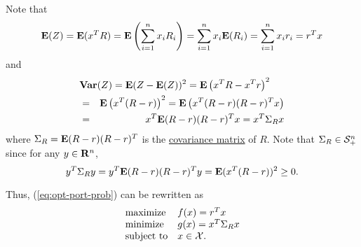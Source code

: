 Note that
\begin{equation}
{\bf E{}}(Z)
= {\bf E{}}(x^T R)
= {\bf E{}} \left(\sum_{i=1}^n x_i R_i \right)
= \sum_{i=1}^n x_i {\bf E{}}(R_i)
= \sum_{i=1}^n x_i r_i
= r^T x
\end{equation}
and
\begin{eqnarray*}
\lefteqn{
\Var(Z) = \Expect(Z-\Expect(Z))^2 = \Expect \left(x^TR-x^Tr \right)^2
}
\\
&=&
\Expect \left(x^T(R-r) \right)^2
= \Expect \left(x^T(R-r)(R-r)^T x \right)
\\
&=&
x^T \Expect(R-r)(R-r)^T x
=
x^T \covmat{R} x
\end{eqnarray*}
where ${\Sigma}_{R} = {\bf E{}}(R-r)(R-r)^T$ is the \href{https://en.wikipedia.org/wiki/Covariance_matrix}{covariance matrix} of $R$.
Note that ${\Sigma}_{R}\in\mathcal{S}_+^{n}$
since for any $y\in\mathbf{R}^n$,
\begin{equation}
y^T {\Sigma}_{R} y = y^T {\bf E{}}(R-r)(R-r)^T y = {\bf E{}}(x^T(R-r))^2 \geq 0.
\end{equation}



Thus, (\ref{eq:opt-port-prob}) can be rewritten as
\begin{equation}
\label{eq:opt-port-prob-vec}
\begin{array}{ll}
\mbox{maximize} & f(x) = r^T x
\\
\mbox{minimize} & g(x) = x^T {\Sigma}_{R} x
\\
\mbox{subject to} & x \in \mathcal{X}.
\end{array}
\end{equation}
